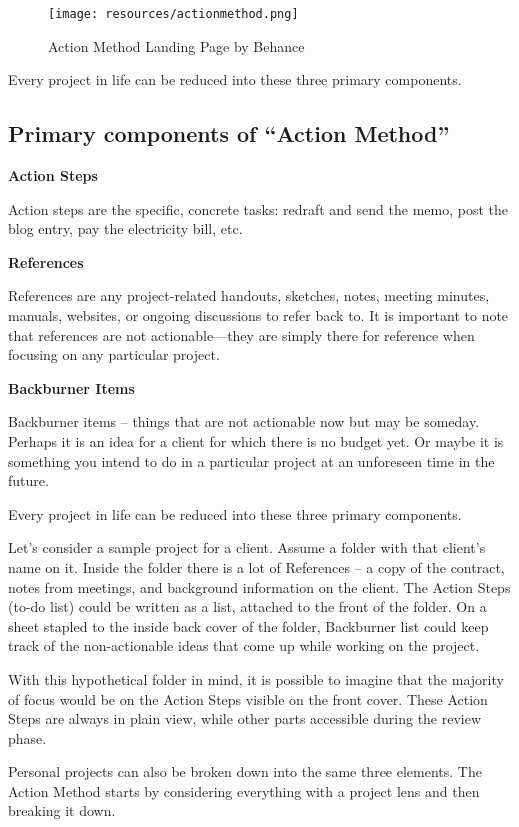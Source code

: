 \begin{figure}
	\centering
	\texttt{[image: resources/actionmethod.png]}
	\caption[Action Method by Behance]{Action Method Landing Page by Behance}
\end{figure}

Every project in life can be reduced into these three primary components.

\subsection{Primary components of ``Action Method''}

\textbf{Action Steps}

Action steps are the specific, concrete tasks: redraft and send the memo, post the blog entry, pay the electricity bill, etc.

\textbf{References}

References are any project-related handouts, sketches, notes, meeting minutes, manuals, websites, or ongoing discussions to refer back to. It is important to note that references are not actionable—they are simply there for reference when focusing on any particular project.

\textbf{Backburner Items}

Backburner items -- things that are not actionable now but may be someday. Perhaps it is an idea for a client for which there is no budget yet. Or maybe it is something you intend to do in a particular project at an unforeseen time in the future.

Every project in life can be reduced into these three primary components.

Let’s consider a sample project for a client. Assume a folder with that client’s name on it. Inside the folder there is a lot of References -- a copy of the contract, notes from meetings, and background information on the client. The Action Steps (to-do list) could be written as a list, attached to the front of the folder. On a sheet stapled to the inside back cover of the folder, Backburner list could keep track of the non-actionable ideas that come up while working on the project.

With this hypothetical folder in mind, it is possible to imagine that the majority of focus would be on the Action Steps visible on the front cover. These Action Steps are always in plain view, while other parts accessible during the review phase.

Personal projects can also be broken down into the same three elements. The Action Method starts by considering everything with a project lens and then breaking it down.

